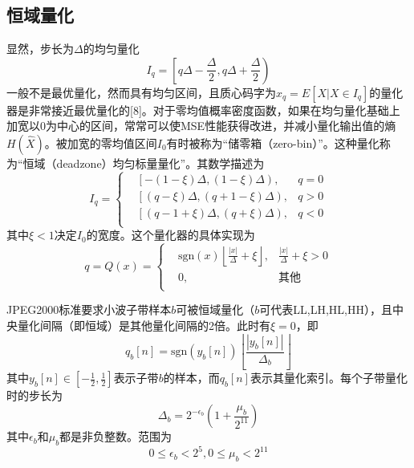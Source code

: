 \subsection{恒域量化}
显然，步长为$\Delta$的均匀量化
\begin{equation}
I_{q}=\left[q\Delta-\frac{\Delta}{2},q\Delta+\frac{\Delta}{2}\right)
\end{equation}
一般不是最优量化，然而具有均匀区间，且质心码字为$\hat{x}_{q}=E[X|X \in I_{q}]$的量化器是非常接近最优量化的[8]。对于零均值概率密度函数，如果在均匀量化基础上加宽以0为中心的区间，常常可以使MSE性能获得改进，并减小量化输出值的熵$H(\hat{X})$。被加宽的零均值区间$I_{0}$有时被称为“储零箱（zero-bin）”。这种量化称为“恒域（deadzone）均匀标量量化”。其数学描述为
\begin{equation}
I_{q}=\left\{
\begin{aligned} %
&\left[-(1-\xi)\Delta, (1-\xi)\Delta\right), &q=0\\
&\left[(q-\xi)\Delta, (q+1-\xi)\Delta\right), &q>0\\
&\left[(q-1+\xi)\Delta, (q+\xi)\Delta\right), &q<0\\
\end{aligned}
\right.
\end{equation}
其中$\xi<1$决定$I_{0}$的宽度。这个量化器的具体实现为
\begin{equation}
q=Q(x)=\left\{
\begin{aligned} %
&\text{sgn}(x)\left\lfloor \frac{|x|}{\Delta}+\xi\right\rfloor, &\frac{|x|}{\Delta}+\xi>0\\
&0, &\text{其他}\\
\end{aligned}
\right.
\end{equation}

JPEG2000标准要求小波子带样本$b$可被恒域量化（$b$可代表LL,LH,HL,HH），且中央量化间隔（即恒域）是其他量化间隔的2倍。此时有$\xi=0$，即
\begin{equation}
q_{b}[n]=\text{sgn}(y_{b}[n])\left\lfloor\frac{|y_{b}[n]|}{\Delta_{b}}\right\rfloor
\end{equation}
其中$y_{b}[n]\in\left[-\frac{1}{2}, \frac{1}{2}\right]$表示子带$b$的样本，而$q_{b}[n]$表示其量化索引。每个子带量化时的步长为
\begin{equation}
\Delta_b=2^{-\epsilon_{b}}\left(1+\frac{\mu_{b}}{2
^{11}}\right)\label{eqn:Deltab}
\end{equation}
其中$\epsilon_{b}$和$\mu_{b}$都是非负整数。范围为
\begin{equation}
0\leq\epsilon_{b}<2^{5}, 0\leq\mu_{b}<2^{11}
\end{equation}

